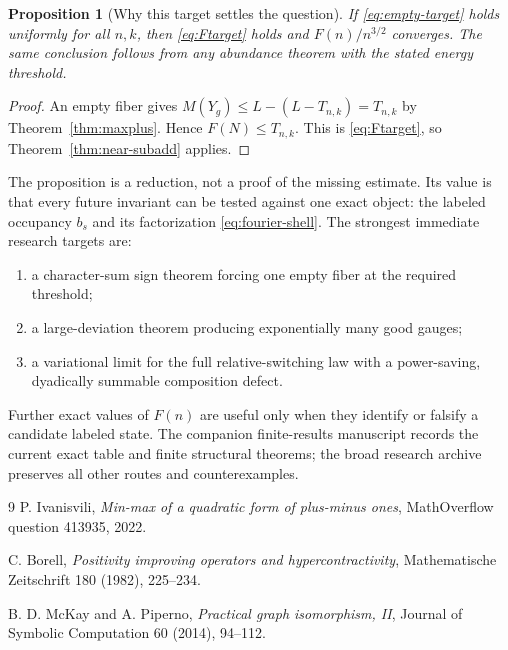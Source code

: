 \documentclass[11pt]{article}
\newtheorem{proposition}[theorem]{Proposition}
\theoremstyle{definition}
\theoremstyle{remark}
\begin{document}
\begin{proposition}[Why this target settles the question]
If \eqref{eq:empty-target} holds uniformly for all $n,k$, then
\eqref{eq:Ftarget} holds and $F(n)/n^{3/2}$ converges.  The same conclusion
follows from any abundance theorem with the stated energy threshold.
\end{proposition}

\begin{proof}
An empty fiber gives $M(Y_g)\le L-(L-T_{n,k})=T_{n,k}$ by
Theorem~\ref{thm:maxplus}.  Hence $F(N)\le T_{n,k}$.  This is
\eqref{eq:Ftarget}, so Theorem~\ref{thm:near-subadd} applies.
\end{proof}

The proposition is a reduction, not a proof of the missing estimate.  Its
value is that every future invariant can be tested against one exact object:
the labeled occupancy $b_s$ and its factorization \eqref{eq:fourier-shell}.
The strongest immediate research targets are:
\begin{enumerate}
\item a character-sum sign theorem forcing one empty fiber at the required
threshold;
\item a large-deviation theorem producing exponentially many good gauges;
\item a variational limit for the full relative-switching law with a
power-saving, dyadically summable composition defect.
\end{enumerate}

Further exact values of $F(n)$ are useful only when they identify or falsify
a candidate labeled state.  The companion finite-results manuscript records
the current exact table and finite structural theorems; the broad research
archive preserves all other routes and counterexamples.

\begin{thebibliography}{9}
P. Ivanisvili,
\emph{Min-max of a quadratic form of plus-minus ones},
MathOverflow question 413935, 2022.

C. Borell,
\emph{Positivity improving operators and hypercontractivity},
Mathematische Zeitschrift 180 (1982), 225--234.

B. D. McKay and A. Piperno,
\emph{Practical graph isomorphism, II},
Journal of Symbolic Computation 60 (2014), 94--112.
\end{thebibliography}
\end{document}
